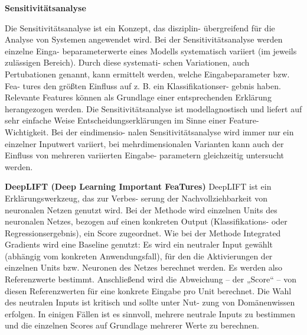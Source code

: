 \documentclass[11pt,a4paper]{article}
\numberwithin{equation}{section}
\begin{document}
	\noindent\textbf{Sensitivitätsanalyse}
	
	Die Sensitivitätsanalyse ist ein Konzept, das disziplin-
	übergreifend für die Analyse von Systemen angewendet
	wird. Bei der Sensitivitätsanalyse werden einzelne Einga-
	beparameterwerte eines Modells systematisch variiert
	(im jeweils zulässigen Bereich). Durch diese systemati-
	schen Variationen, auch Pertubationen genannt, kann
	ermittelt werden, welche Eingabeparameter bzw. Fea-
	tures den größten Einfluss auf z. B. ein Klassifikationser-
	gebnis haben. Relevante Features können als Grundlage
	einer entsprechenden Erklärung herangezogen werden.
	Die Sensitivitätsanalyse ist modellagnostisch und liefert
	auf sehr einfache Weise Entscheidungserklärungen im
	Sinne einer Feature-Wichtigkeit. Bei der eindimensio-
	nalen Sensitivitätsanalyse wird immer nur ein einzelner
	Inputwert variiert, bei mehrdimensionalen Varianten
	kann auch der Einfluss von mehreren variierten Eingabe-
	parametern gleichzeitig untersucht werden.
	
	\noindent \textbf{DeepLIFT (Deep Learning Important
		FeaTures)}
	DeepLIFT ist ein Erklärungswerkzeug, das zur Verbes-
	serung der Nachvollziehbarkeit von neuronalen Netzen
	genutzt wird. Bei der Methode wird einzelnen Units des
	neuronalen Netzes, bezogen auf einen konkreten Output
	(Klassifikations- oder Regressionsergebnis), ein Score
	zugeordnet. Wie bei der Methode Integrated Gradients
	wird eine Baseline genutzt: Es wird ein neutraler Input
	gewählt (abhängig vom konkreten Anwendungsfall),
	für den die Aktivierungen der einzelnen Units bzw.
	Neuronen des Netzes berechnet werden. Es werden
	also Referenzwerte bestimmt. Anschließend wird die
	Abweichung – der „Score“ – von diesen Referenzwerten
	für eine konkrete Eingabe pro Unit berechnet. Die Wahl
	des neutralen Inputs ist kritisch und sollte unter Nut-
	zung von Domänenwissen erfolgen. In einigen Fällen ist es sinnvoll, mehrere neutrale Inputs zu bestimmen und
	die einzelnen Scores auf Grundlage mehrerer Werte zu
	berechnen.
	
\end{document}
